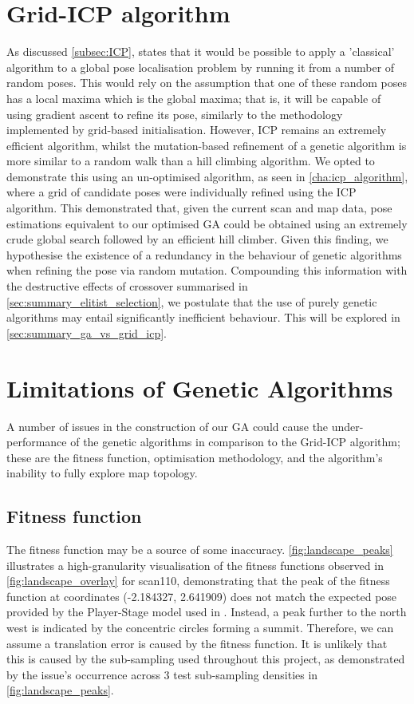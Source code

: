 \documentclass[authoryearcitations]{UoYCSproject}
\begin{document}
\section{Grid-ICP algorithm}
As discussed \autoref{subsec:ICP}, \citet{Censi2005-iv} states that it would be possible to apply a 'classical' algorithm to a global pose localisation problem by running it from a number of random poses. This would rely on the assumption that one of these random poses has a local maxima which is the global maxima; that is, it will be capable of using gradient ascent to refine its pose, similarly to the methodology implemented by grid-based initialisation. However, ICP remains an extremely efficient algorithm, whilst the mutation-based refinement of a genetic algorithm is more similar to a random walk than a hill climbing algorithm. We opted to demonstrate this using an un-optimised algorithm, as seen in \autoref{cha:icp_algorithm}, where a grid of candidate poses were individually refined using the ICP algorithm. This demonstrated that, given the current scan and map data, pose estimations equivalent to our optimised GA could be obtained using an extremely crude global search followed by an efficient hill climber. Given this finding, we hypothesise the existence of a redundancy in the behaviour of genetic algorithms when refining the pose via random mutation. Compounding this information with the destructive effects of crossover summarised in \autoref{sec:summary_elitist_selection}, we postulate that the use of purely genetic algorithms may entail significantly inefficient behaviour. This will be explored in \autoref{sec:summary_ga_vs_grid_icp}.


\section{Limitations of Genetic Algorithms}
\label{sec:algorithm_limitations}
A number of issues in the construction of our GA could cause the under-performance of the genetic algorithms in comparison to the Grid-ICP algorithm; these are the fitness function, optimisation methodology, and the algorithm's inability to fully explore map topology.

\subsection{Fitness function}
\label{subsec:criticism_fitness_func}
The fitness function may be a source of some inaccuracy. \autoref{fig:landscape_peaks} illustrates a high-granularity visualisation of the fitness functions observed in \autoref{fig:landscape_overlay} for scan110, demonstrating that the peak of the fitness function at coordinates (-2.184327, 2.641909) does not match the expected pose provided by the Player-Stage model used in \citet{Lenac2011-co}. Instead, a peak further to the north west is indicated by the concentric circles forming a summit. Therefore, we can assume a translation error is caused by the fitness function. It is unlikely that this is caused by the sub-sampling used throughout this project, as demonstrated by the issue's occurrence across 3 test sub-sampling densities in \autoref{fig:landscape_peaks}. \newline
\end{document}
